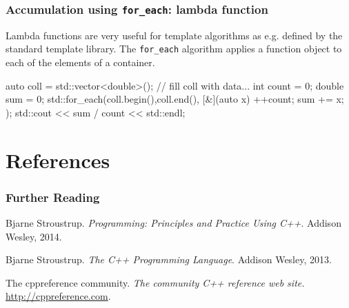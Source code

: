 \documentclass[aspectratio=169,ignorenonframetext,11pt]{beamer}
\def\inline{\lstinline[basicstyle=\small\ttfamily]}
\begin{document}
\begin{frame}[fragile] \frametitle{Accumulation using
    \inline!for_each!: lambda function}

Lambda functions are very useful for template algorithms as e.g. defined by the standard template library. The \inline!for_each! algorithm applies a function object to each of the elements of a container.

\vspace*{2em}

  \begin{cppcode}
auto coll = std::vector<double>();
// fill coll with data...
int count = 0;
double sum = 0;
std::for_each(coll.begin(),coll.end(),
              [&](auto x){ ++count; sum += x; } );
std::cout << sum / count << std::endl;
  \end{cppcode}
\end{frame}



\section{References}

\begin{frame} \frametitle<presentation>{Further Reading}

\begin{thebibliography}{Vandervoorde and Josuttis(2003)}

Bjarne Stroustrup.
\newblock \emph{Programming: Principles and Practice Using C++}.
\newblock Addison Wesley, 2014.

Bjarne Stroustrup.
\newblock \emph{The C++ Programming Language}.
\newblock Addison Wesley, 2013.

The cppreference community.
\newblock \emph{The community C++ reference web site.}
\newblock \alert<2>{\url{http://cppreference.com}}.

\end{thebibliography}
\end{frame}
\end{document}
